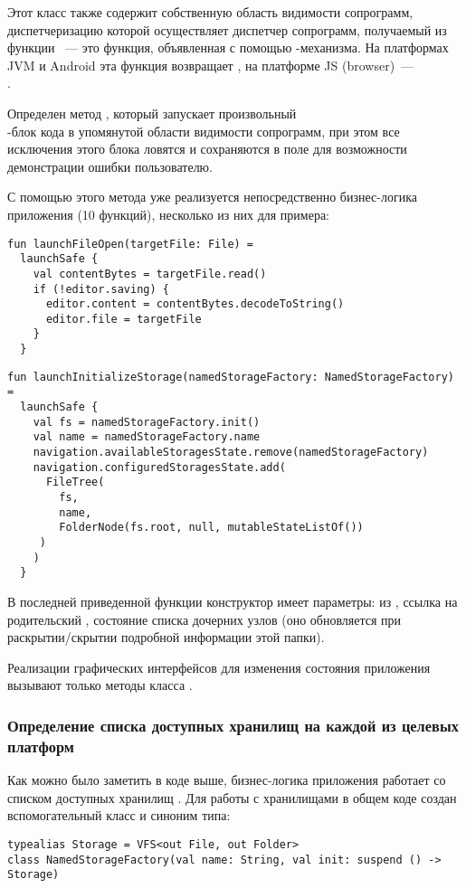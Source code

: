     Этот класс также содержит собственную область видимости сопрограмм, диспетчеризацию которой осуществляет диспетчер сопрограмм, получаемый из функции ~--- это функция, объявленная с помощью -механизма. На платформах JVM и Android эта функция возвращает , на платформе JS (browser)~---\\ . 

    Определен метод , который запускает произвольный\\ -блок кода в упомянутой области видимости сопрограмм, при этом все исключения этого блока ловятся и сохраняются в поле  для возможности демонстрации ошибки пользователю.

    С помощью этого метода уже реализуется непосредственно бизнес-логика приложения (10 функций), несколько из них для примера:

    \begin{verbatim}
fun launchFileOpen(targetFile: File) =
  launchSafe {
    val contentBytes = targetFile.read()
    if (!editor.saving) {
      editor.content = contentBytes.decodeToString()
      editor.file = targetFile
    }
  }
    \end{verbatim}

    \begin{verbatim}
fun launchInitializeStorage(namedStorageFactory: NamedStorageFactory) =
  launchSafe {
    val fs = namedStorageFactory.init()
    val name = namedStorageFactory.name
    navigation.availableStoragesState.remove(namedStorageFactory)
    navigation.configuredStoragesState.add(
      FileTree(
        fs,
        name,
        FolderNode(fs.root, null, mutableStateListOf())
     )
    )
  }
    \end{verbatim}

    В последней приведенной функции конструктор  имеет параметры:  из , ссылка на родительский , состояние списка дочерних узлов (оно обновляется при раскрытии/скрытии подробной информации этой папки).

    Реализации графических интерфейсов для изменения состояния приложения вызывают только методы класса .

  \subsubsection{Определение списка доступных хранилищ на каждой из целевых платформ}
    Как можно было заметить в коде выше, бизнес-логика приложения работает со списком доступных хранилищ . Для работы с хранилищами  в общем коде создан вспомогательный класс и синоним типа:
    \begin{verbatim}
typealias Storage = VFS<out File, out Folder>
class NamedStorageFactory(val name: String, val init: suspend () -> Storage)
    \end{verbatim}


